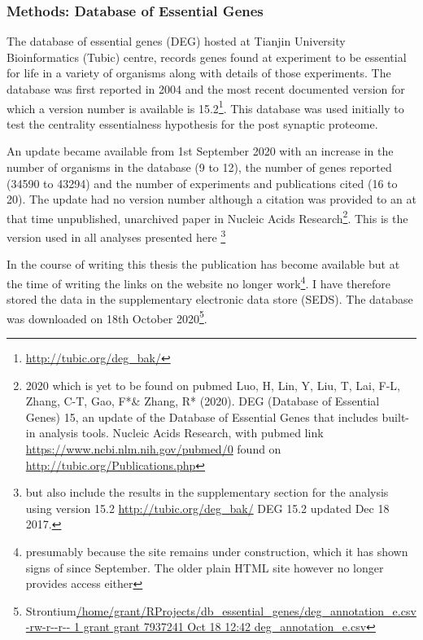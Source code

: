 \subsubsection{Methods: Database of Essential Genes}
 \label{sec:Database of essential genes}
 
 
 
 The database of essential genes (DEG) hosted at Tianjin University Bioinformatics (Tubic) centre, records genes found at experiment to be essential for life in a variety of organisms along with details of those experiments. The database was first reported in 2004 and the most recent documented version for which a version number is available is 15.2\footnote{\url{ http://tubic.org/deg_bak/}}\cite{luo2014deg}. This database was used initially to test the centrality essentialness hypothesis for the post synaptic proteome. 
 
An update became available from 1st September 2020 with an increase in the number of organisms in the database (9 to 12), the number of genes reported (34590 to 43294) and the number of experiments and publications cited (16 to 20). The update had no version number although a citation was provided to an at that time unpublished, unarchived paper in Nucleic Acids Research\footnote{2020 which is yet to be found on pubmed Luo, H, Lin, Y, Liu, T, Lai, F-L, Zhang, C-T, Gao, F*\& Zhang, R* (2020). DEG (Database of Essential Genes) 15, an update of the Database of Essential Genes that includes built-in analysis tools. Nucleic Acids Research, with pubmed link \url{https://www.ncbi.nlm.nih.gov/pubmed/0} found on \url{http://tubic.org/Publications.php}}. This is the version used in all analyses presented here \footnote{but also include the results in the supplementary section for the analysis using version 15.2 \url{ http://tubic.org/deg_bak/} DEG 15.2 updated Dec 18 2017\cite{luo2014deg}.}
 
 In the course of writing this thesis the publication has become available\cite{luo2021deg} but at the time of writing the links on the website no longer work\footnote{presumably because the site remains under construction, which it has shown signs of since September. The older plain HTML site however no longer provides access either}. I have therefore stored the data in the supplementary electronic data store (SEDS). The database was downloaded on 18th October 2020\footnote{Strontium\url{/home/grant/RProjects/db_essential_genes/deg_annotation_e.csv} \url{-rw-r--r-- 1 grant grant 7937241 Oct 18 12:42 deg_annotation_e.csv}}.
 

